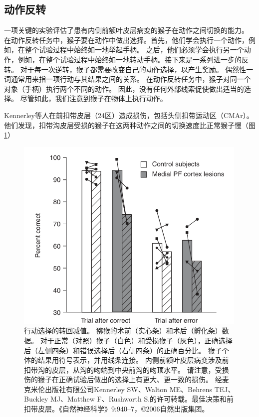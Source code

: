 \subsection{动作反转}

一项关键的实验评估了患有内侧前额叶皮层病变的猴子在动作之间切换的能力\cite{kennerley2006optimal}。
在动作反转任务中，猴子要在动作中做出选择。首先，他们学会执行一个动作，例如，在整个试验过程中始终如一地举起手柄。
之后，他们必须学会执行另一个动作，例如，在整个试验过程中始终如一地转动手柄。接下来是一系列进一步的反转。
对于每一次逆转，猴子都需要改变自己的动作选择，以产生奖励。
偶然性一词通常用来指一项行动与其结果之间的关系。
在动作反转任务中，猴子对同一个对象（手柄）执行两个不同的动作。
因此，没有任何外部线索促使做出适当的选择。
尽管如此，我们注意到猴子在物体上执行动作。\par
Kennerley等人在前扣带皮层（24区）造成损伤，包括头侧扣带运动区（CMAr）。
他们发现，扣带沟皮层受损的猴子在这两种动作之间的切换速度比正常猴子慢（图\ref{fig:3_8}）\par


\begin{figure}[!htb]
	\centering
 	\includegraphics{image_pfc/Fig_3_8}
	\caption{行动选择的转回减值。
		猕猴的术前（实心条）和术后（孵化条）数据。
		对于正常（对照）猴子（白色）和受损猴子（灰色），正确选择后（左侧四条）和错误选择后（右侧四条）的正确百分比。
		猴子个体的结果用符号表示，并用线条连接。
		内侧前额叶皮层病变涉及前扣带沟的皮层，从沟的吻端到中央前沟的吻顶水平。
		请注意，受损伤的猴子在正确试验后做出的选择上有更大、更一致的损伤。
		经麦克米伦出版社有限公司Kennerley SW、Walton ME、Behrens TEJ、Buckley MJ、Matthew F、Rushworth S.的许可转载。最佳决策和前扣带皮层。《自然神经科学》9:940–7，©2006自然出版集团。}
	\label{fig:3_8}
\end{figure}


